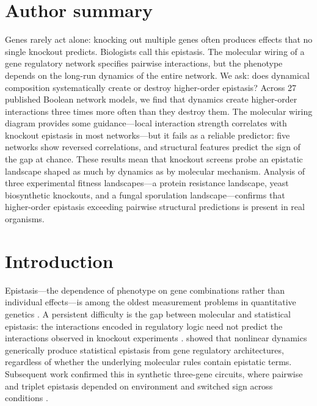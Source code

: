 \documentclass[10pt]{article}
\begin{document}
\section*{Author summary}
Genes rarely act alone: knocking out multiple genes often produces
effects that no single knockout predicts. Biologists call this epistasis.
The molecular wiring of a gene regulatory network specifies pairwise
interactions, but the phenotype depends on the long-run dynamics of the
entire network. We ask: does dynamical composition systematically create
or destroy higher-order epistasis? Across 27 published Boolean network
models, we find that dynamics create higher-order interactions three
times more often than they destroy them. The molecular wiring diagram
provides some guidance---local interaction strength correlates with
knockout epistasis in most networks---but it fails as a reliable
predictor: five networks show reversed correlations, and structural
features predict the sign of the gap at chance. These results mean
that knockout screens probe an epistatic landscape shaped as much by
dynamics as by molecular mechanism. Analysis of three experimental
fitness landscapes---a protein resistance landscape, yeast
biosynthetic knockouts, and a fungal sporulation landscape---confirms
that higher-order epistasis exceeding pairwise structural predictions
is present in real organisms.


\section{Introduction}
\label{sec:intro}

Epistasis---the dependence of phenotype on gene combinations rather
than individual effects---is among the oldest measurement problems in
quantitative genetics \citep{fisher1918correlation, bateson1909heredity}. A
persistent difficulty is the gap between molecular and statistical
epistasis: the interactions encoded in regulatory logic need not
predict the interactions observed in knockout experiments
\citep{phillips2008epistasis}. \citet{gjuvsland2007statistical} showed
that nonlinear dynamics generically produce statistical epistasis from
gene regulatory architectures, regardless of whether the underlying
molecular rules contain epistatic terms. Subsequent work confirmed this in synthetic three-gene
circuits, where pairwise and triplet epistasis depended on environment
and switched sign across conditions \citep{baier2023environment}.
\end{document}
